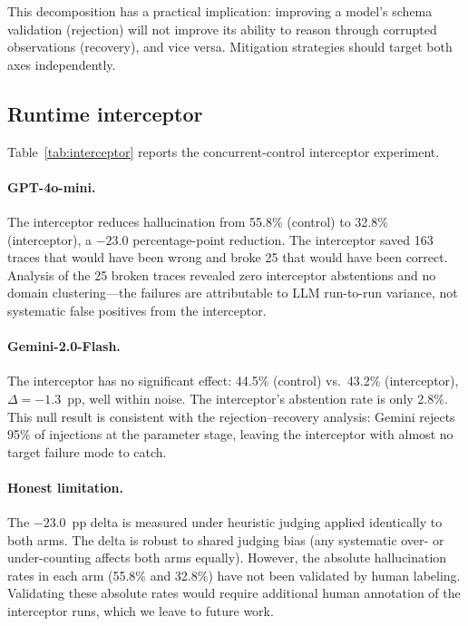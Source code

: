 \documentclass[preprint,review,12pt,3p]{elsarticle}
\begin{document}
This decomposition has a practical implication: improving a model's
schema validation (rejection) will not improve its ability to reason
through corrupted observations (recovery), and vice versa.
Mitigation strategies should target both axes independently.

\subsection{Runtime interceptor}
\label{sec:interceptor}

Table~\ref{tab:interceptor} reports the concurrent-control interceptor
experiment.



\paragraph{GPT-4o-mini.}
The interceptor reduces hallucination from 55.8\% (control) to 32.8\%
(interceptor), a $-23.0$ percentage-point reduction.
The interceptor saved 163 traces that would have been wrong and broke
25 that would have been correct.
Analysis of the 25 broken traces revealed zero interceptor abstentions
and no domain clustering---the failures are attributable to LLM
run-to-run variance, not systematic false positives from the
interceptor.

\paragraph{Gemini-2.0-Flash.}
The interceptor has no significant effect: 44.5\% (control) vs.\
43.2\% (interceptor), $\Delta{=}{-}1.3$~pp, well within noise.
The interceptor's abstention rate is only 2.8\%.
This null result is consistent with the rejection--recovery analysis:
Gemini rejects 95\% of injections at the parameter stage, leaving the
interceptor with almost no target failure mode to catch.

\paragraph{Honest limitation.}
The $-23.0$~pp delta is measured under heuristic judging applied
identically to both arms.
The delta is robust to shared judging bias (any systematic over- or
under-counting affects both arms equally).
However, the absolute hallucination rates in each arm (55.8\% and
32.8\%) have not been validated by human labeling.
Validating these absolute rates would require additional human
annotation of the interceptor runs, which we leave to future work.
\end{document}
